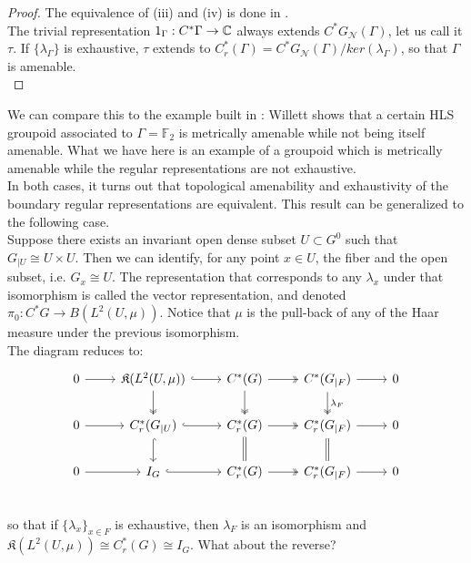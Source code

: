 \begin{proof}
The equivalence of (iii) and (iv) is done in \cite{WillettNonamenable}.\\

The trivial representation $1_\Gamma: C^*\Gamma \rightarrow \mathbb C$ always extends $C^*G_{\mathcal N}(\Gamma)$, let us call it $\tau$. If $\{\lambda_\Gamma\}$ is exhaustive, $\tau$ extends to $C^*_r(\Gamma)= C^*G_{\mathcal N}(\Gamma)/ker(\lambda_\Gamma)$, so that $\Gamma$ is amenable. \\
\end{proof}

We can compare this to the example built in \cite{WillettNonamenable}: Willett shows that a certain HLS groupoid associated to $\Gamma=\mathbb F_2$ is metrically amenable while not being itself amenable. What we have here is an example of a groupoid which is metrically amenable while the regular representations are not exhaustive.\\

In both cases, it turns out that topological amenability and exhaustivity of the boundary regular representations are equivalent. This result can be generalized to the following case.\\

Suppose there exists an invariant open dense subset $U\subset G^0$ such that $G_{|U}\cong U\times U$. Then we can identify, for any point $x\in U$, the fiber and the open subset, i.e. $G_x\cong U$. The representation that corresponds to any $\lambda_x$ under that isomorphism is called the vector representation, and denoted $\pi_0 : C^*G \rightarrow B(L^2(U,\mu))$. Notice that $\mu $ is the pull-back of any of the Haar measure under the previous isomorphism.\\

The diagram reduces to:
\[\begin{tikzcd}
0 \arrow{r} & \mathfrak K(L^2(U,\mu)) \arrow[r,hook] \arrow[d, two heads] & C^*(G)\arrow[r, two heads] \arrow[d, two heads] & C^*(G_{|F})\arrow{r} \arrow[d, two heads, "\lambda_F" ] & 0 \\
0 \arrow{r} &  C_r^*(G_{|U})\arrow[r,hook] \arrow[d,hook] & C_r^*(G)\arrow[r, two heads]  \arrow[d,equal] & C_r^*(G_{|F})\arrow{r} \arrow[d,equal] & 0 \\
0 \arrow{r} &  I_G \arrow[r,hook] & C_r^*(G)\arrow[r, two heads] & C_r^*(G_{|F})\arrow{r} & 0 \\
\end{tikzcd}\]
so that if $\{\lambda_x\}_{x\in F}$ is exhaustive, then $\lambda_F$ is an isomorphism and $\mathfrak K(L^2(U,\mu))\cong C^*_r(G) \cong I_G$. What about the reverse?
\newpage

